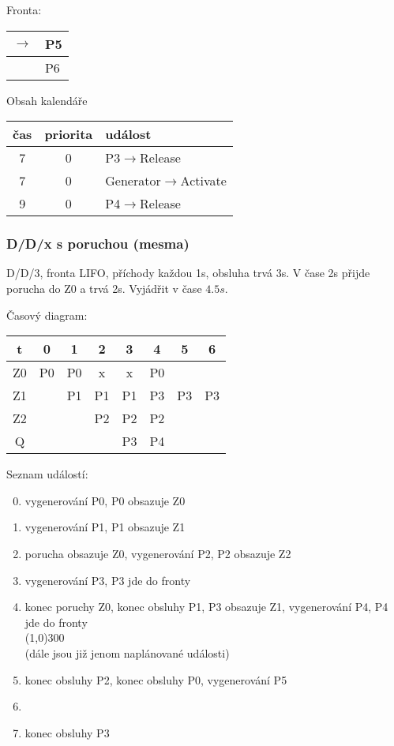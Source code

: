 \documentclass[11pt]{article} %
\begin{document}
\vskip 0.3cm
\noindent
Fronta:
\begin{tabular}{|rl|}
\hline
$\rightarrow$ & P5 \\
\hline
& P6\\
\hline
\end{tabular}

\vskip 0.3cm
\noindent
Obsah kalendáře
\begin{tabular}{|c|c|l|}
\hline
čas & priorita & událost \\
\hline
7 & 0 & P3$\rightarrow$Release\\
7 & 0 & Generator$\rightarrow$Activate\\
9 & 0 & P4$\rightarrow$Release\\
\hline
\end{tabular}

\newpage


\subsubsection{D/D/x s poruchou (mesma)}
D/D/3, fronta LIFO, příchody každou 1s, obsluha trvá 3s. V čase 2s přijde porucha do Z0 a trvá 2s. Vyjádřit v čase $4.5s$.
\vskip 0.25cm

\noindent
Časový diagram:
\vskip 0.1cm

\begin{tabular}{|c||ccccc|cc|}
\hline
t & 0 & 1 & 2 & 3 & 4 & 5 & 6 \\
\hline
\hline
Z0 & P0 & P0 & x & x & P0 & & \\
Z1 & & P1 & P1 & P1 & P3 & P3 & P3\\
Z2 & & & P2 & P2 & P2 & & \\
\hline
Q & & & & P3 & P4 & & \\
\hline
\end{tabular}

\vskip 0.3cm
\noindent
Seznam událostí:
\begin{enumerate}
\setcounter{enumi}{-1}
\item
 vygenerování P0, P0 obsazuje Z0
\item
 vygenerování P1, P1 obsazuje Z1
\item
 porucha obsazuje Z0, vygenerování P2, P2 obsazuje Z2
\item
 vygenerování P3, P3 jde do fronty
\item
 konec poruchy Z0, konec obsluhy P1, P3 obsazuje Z1, vygenerování P4, P4 jde do fronty
\\\line(1,0){300}
\\(dále jsou již jenom naplánované události)

\item
 konec obsluhy P2, konec obsluhy P0, vygenerování P5
\item

\item
 konec obsluhy P3
\end{enumerate}
\end{document}
